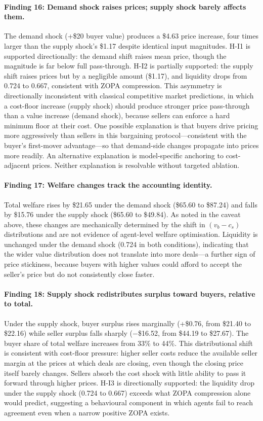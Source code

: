 \paragraph{Finding 16: Demand shock raises prices; supply shock barely affects them.}
The demand shock (+\$20 buyer value) produces a \$4.63 price increase, four times larger than the supply shock's \$1.17 despite identical input magnitudes.  H-I1 is supported directionally: the demand shift raises mean price, though the magnitude is far below full pass-through.  H-I2 is partially supported: the supply shift raises prices but by a negligible amount (\$1.17), and liquidity drops from 0.724 to 0.667, consistent with ZOPA compression.  This asymmetry is directionally inconsistent with classical competitive market predictions, in which a cost-floor increase (supply shock) should produce stronger price pass-through than a value increase (demand shock), because sellers can enforce a hard minimum floor at their cost.  One possible explanation is that buyers drive pricing more aggressively than sellers in this bargaining protocol---consistent with the buyer's first-mover advantage---so that demand-side changes propagate into prices more readily.  An alternative explanation is model-specific anchoring to cost-adjacent prices.  Neither explanation is resolvable without targeted ablation.

\paragraph{Finding 17: Welfare changes track the accounting identity.}
Total welfare rises by \$21.65 under the demand shock (\$65.60 to \$87.24) and falls by \$15.76 under the supply shock (\$65.60 to \$49.84).  As noted in the caveat above, these changes are mechanically determined by the shift in $(v_b - c_s)$ distributions and are not evidence of agent-level welfare optimisation.  Liquidity is unchanged under the demand shock (0.724 in both conditions), indicating that the wider value distribution does not translate into more deals---a further sign of price stickiness, because buyers with higher values could afford to accept the seller's price but do not consistently close faster.

\paragraph{Finding 18: Supply shock redistributes surplus toward buyers, relative to total.}
Under the supply shock, buyer surplus rises marginally (+\$0.76, from \$21.40 to \$22.16) while seller surplus falls sharply ($-$\$16.52, from \$44.19 to \$27.67).  The buyer share of total welfare increases from 33\% to 44\%.  This distributional shift is consistent with cost-floor pressure: higher seller costs reduce the available seller margin at the prices at which deals are closing, even though the closing price itself barely changes.  Sellers absorb the cost shock with little ability to pass it forward through higher prices.  H-I3 is directionally supported: the liquidity drop under the supply shock (0.724 to 0.667) exceeds what ZOPA compression alone would predict, suggesting a behavioural component in which agents fail to reach agreement even when a narrow positive ZOPA exists.

